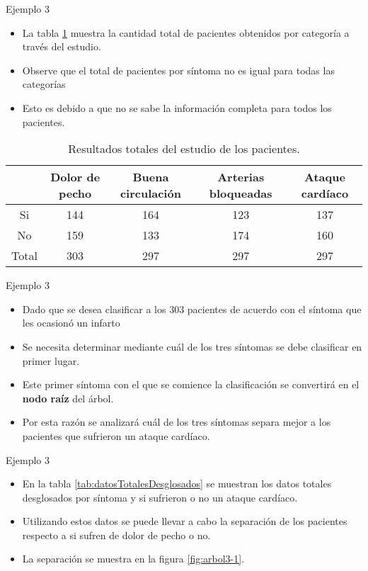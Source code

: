 \documentclass[11pt,aspectratio=169]{beamer}
\begin{document}
\begin{frame}{Ejemplo 3}
	\begin{itemize}
		\item La tabla \ref{tab:datosTotalesPacientes} muestra la cantidad total de pacientes obtenidos 
			por categoría a través del estudio. \pause 
		\item Observe que el total de pacientes por síntoma no es igual para todas las categorías \pause
		\item Esto es debido a que no se sabe la información completa para todos los pacientes. \pause
	\end{itemize}

\begin{table}
	\centering
	\begin{tabular}{c|c|c|c|c}
		\toprule
		 & Dolor de pecho & Buena circulación & Arterias bloqueadas & Ataque cardíaco \\
		\midrule		
		Si & 144 & 164 & 123 & 137 \\\midrule
		No & 159 & 133 & 174 & 160 \\\midrule
		Total & 303 & 297 & 297 & 297\\
		\bottomrule
	\end{tabular}
	\caption{Resultados totales del estudio de los pacientes.}
	\label{tab:datosTotalesPacientes}
\end{table}
\end{frame}

\begin{frame}{Ejemplo 3}
	\begin{itemize}
		\item Dado que se desea clasificar a los 303 pacientes de acuerdo con el síntoma que les ocasionó un infarto \pause
		\item Se necesita determinar mediante cuál de los tres síntomas se debe clasificar en primer lugar.\pause
		\item Este primer síntoma con el que se comience la clasificación se convertirá en el \textbf{nodo raíz} del árbol.\pause
		\item Por esta razón se analizará cuál de los tres síntomas separa mejor a los pacientes que sufrieron un ataque cardíaco.
	\end{itemize}
\end{frame}

\begin{frame}{Ejemplo 3}
	\begin{itemize}
		\item En la tabla \ref{tab:datosTotalesDesglosados} se muestran los datos totales desglosados por síntoma y si sufrieron o
			no un ataque cardíaco. \pause
		\item Utilizando estos datos se puede llevar a cabo la separación de los pacientes respecto a si sufren de dolor de pecho 
			o no. \pause
		\item La separación se muestra en la figura \ref{fig:arbol3-1}.
	\end{itemize}
\end{frame}
\end{document}
